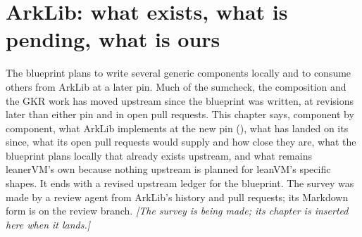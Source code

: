 \chapter[ArkLib: exists, pending, ours]{ArkLib: what exists, what is pending, what is ours}\label{ch:arklib-landscape}

The blueprint plans to write several generic components locally and to consume others from
ArkLib at a later pin. Much of the sumcheck, the composition and the GKR work has moved
upstream since the blueprint was written, at revisions later than either pin and in open pull
requests. This chapter says, component by component, what ArkLib implements at the new pin
(), what has landed on its  since, what its open pull requests would
supply and how close they are, what the blueprint plans locally that already exists upstream,
and what remains leanerVM's own because nothing upstream is planned for leanVM's specific
shapes. It ends with a revised upstream ledger for the blueprint. The survey was made by a
review agent from ArkLib's history and pull requests; its Markdown form is
 on the review branch.
\ifarklibready{}\else\emph{[The survey is
being made; its chapter is inserted here when it lands.]}\fi
